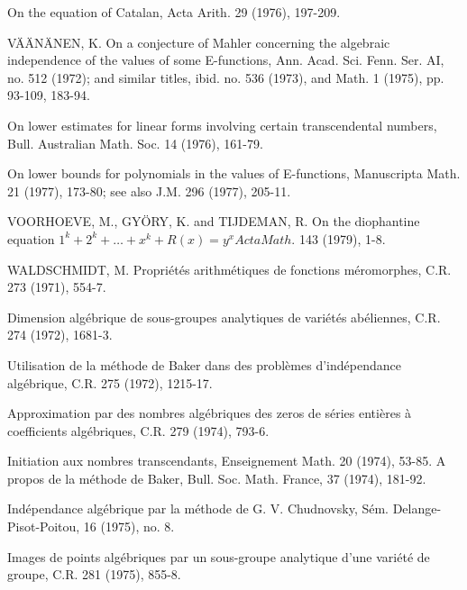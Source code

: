 \begin{hanglist}
    \item \hspace{1.5em} On the equation of Catalan, Acta Arith. 29 (1976), 197-209.
    \item VÄÄNÄNEN, K. On a conjecture of Mahler concerning the algebraic independence of the values of some E-functions, Ann. Acad. Sci. Fenn. Ser. AI, no. 512 (1972); and similar titles, ibid. no. 536 (1973), and Math. 1 (1975), pp. 93-109, 183-94.
    \item \hspace{1.5em} On lower estimates for linear forms involving certain transcendental numbers, Bull. Australian Math. Soc. 14 (1976), 161-79.
    \item \hspace{1.5em} On lower bounds for polynomials in the values of E-functions, Manuscripta Math. 21 (1977), 173-80; see also J.M. 296 (1977), 205-11.
    \item VOORHOEVE, M., GYÖRY, K. and TIJDEMAN, R. On the diophantine equation  $1^k + 2^k + \ldots + x^k + R(x) = y^x Acta Math.$  143 (1979), 1-8.
    \item WALDSCHMIDT, M. Propriétés arithmétiques de fonctions méromorphes, C.R. 273 (1971), 554-7.
    \item \hspace{1.5em} Dimension algébrique de sous-groupes analytiques de variétés abéliennes, C.R. 274 (1972), 1681-3.
    \item \hspace{1.5em} Utilisation de la méthode de Baker dans des problèmes d'indépendance algébrique, C.R. 275 (1972), 1215-17.
    \item \hspace{1.5em} Approximation par des nombres algébriques des zeros de séries entières à coefficients algébriques, C.R. 279 (1974), 793-6.
    \item \hspace{1.5em} Initiation aux nombres transcendants, Enseignement Math. 20 (1974), 53-85. A propos de la méthode de Baker, Bull. Soc. Math. France, 37 (1974), 181-92.
    \item \hspace{1.5em} Indépendance algébrique par la méthode de G. V. Chudnovsky, Sém. Delange-Pisot-Poitou, 16 (1975), no. 8.
    \item \hspace{1.5em} Images de points algébriques par un sous-groupe analytique d'une variété de groupe, C.R. 281 (1975), 855-8.

\end{hanglist}
